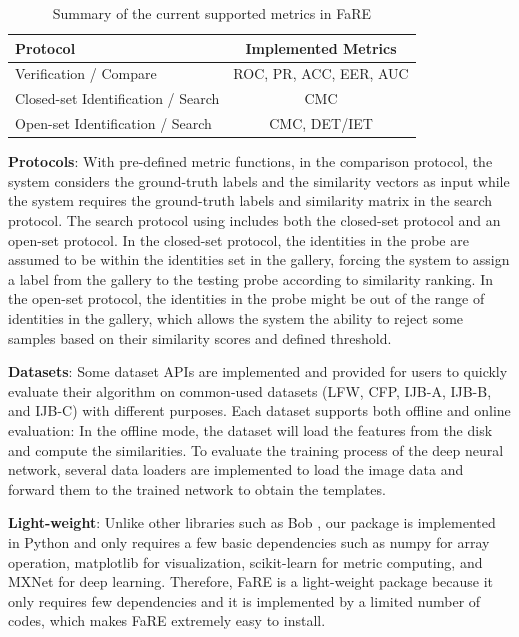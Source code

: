 \documentclass{article}
\begin{document}
\begin{table}[htb]
\begin{center}
\begin{adjustbox}{max width=\linewidth}
\begin{tabular}{lc}
    \toprule
    Protocol & Implemented Metrics \\
    \midrule
    Verification / Compare & ROC, PR, ACC, EER, AUC \\
    Closed-set Identification / Search & CMC \\
    Open-set Identification / Search & CMC, DET/IET \\
    \bottomrule
\end{tabular}
\end{adjustbox}
\end{center}
\vspace{-1em}
\caption{Summary of the current supported metrics in FaRE}
\vspace{-1em}
\label{TAB:FaRE-Protocol}
\end{table}

\noindent \textbf{Protocols}:
With pre-defined metric functions, in the comparison protocol, the system considers the ground-truth labels and the similarity vectors as input while the system requires the ground-truth labels and similarity matrix in the search protocol.
The search protocol using includes both the closed-set protocol and an open-set protocol.
In the closed-set protocol, the identities in the probe are assumed to be within the identities set in the gallery, forcing the system to assign a label from the gallery to the testing probe according to similarity ranking.
In the open-set protocol, the identities in the probe might be out of the range of identities in the gallery, which allows the system the ability to reject some samples based on their similarity scores and defined threshold.

\noindent \textbf{Datasets}:
Some dataset APIs are implemented and provided for users to quickly evaluate their algorithm on common-used datasets (LFW, CFP, IJB-A, IJB-B, and IJB-C) with different purposes.
Each dataset supports both offline and online evaluation: 
In the offline mode, the dataset will load the features from the disk and compute the similarities.
To evaluate the training process of the deep neural network, several data loaders are implemented to load the image data and forward them to the trained network to obtain the templates.

\noindent \textbf{Light-weight}:
Unlike other libraries such as Bob \cite{Anjos_2012_190717}, our package is implemented in Python and only requires a few basic dependencies such as numpy for array operation, matplotlib for visualization, scikit-learn \cite{Pedregosa_2011_190117} for metric computing, and MXNet \cite{Chen_2015_181026} for deep learning. 
Therefore, FaRE is a light-weight package because it only requires few dependencies and it is implemented by a limited number of codes, which makes FaRE extremely easy to install.
\end{document}
